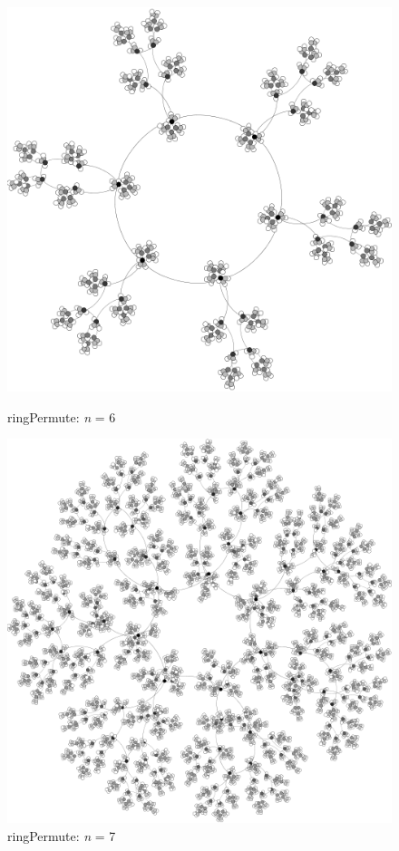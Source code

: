 \documentclass[12pt]{article}
\begin{document}
\begin{figure}[ht]
\hspace{0.5cm}
\begin{minipage}[b]{0.5\linewidth}
\centering
\includegraphics[scale=0.15]{Graphs/6-permute.png}
\caption{ringPermute: \emph{n} = 6}
\label{ringPermute-6}
\end{minipage}
\hspace{0.5cm}
\begin{minipage}[b]{0.5\linewidth}
\centering
\includegraphics[scale=0.15]{Graphs/7-permute1024.png}
\caption{ringPermute: \emph{n} = 7}
\label{ringPermute-7}
\end{minipage}
\end{figure}
\end{document}
